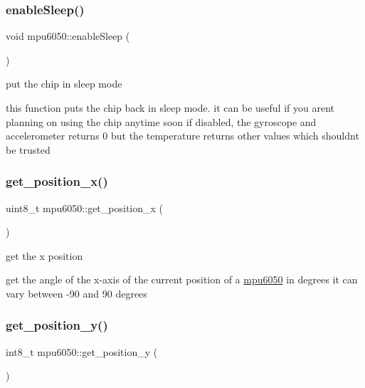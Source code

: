 \subsubsection{\texorpdfstring{enable\+Sleep()}{enableSleep()}}
{\footnotesize\ttfamily void mpu6050\+::enable\+Sleep (\begin{DoxyParamCaption}{ }\end{DoxyParamCaption})\hspace{0.3cm}{\ttfamily [inline]}}



put the chip in sleep mode 

this function puts the chip back in sleep mode. it can be useful if you aren\textquotesingle{}t planning on using the chip anytime soon if disabled, the gyroscope and accelerometer returns 0 but the temperature returns other values which shouldn\textquotesingle{}t be trusted \mbox{\label{classmpu6050_a2de2ed1159eb80c0fc3d0a273b7e058c}} 
\subsubsection{\texorpdfstring{get\+\_\+position\+\_\+x()}{get\_position\_x()}}
{\footnotesize\ttfamily uint8\+\_\+t mpu6050\+::get\+\_\+position\+\_\+x (\begin{DoxyParamCaption}{ }\end{DoxyParamCaption})\hspace{0.3cm}{\ttfamily [inline]}}



get the x position 

get the angle of the x-\/axis of the current position of a \hyperlink{classmpu6050}{mpu6050} in degrees it can vary between -\/90 and 90 degrees \mbox{\label{classmpu6050_ac11bddbc6795e1c36b1f89b743ce63ec}} 
\subsubsection{\texorpdfstring{get\+\_\+position\+\_\+y()}{get\_position\_y()}}
{\footnotesize\ttfamily int8\+\_\+t mpu6050\+::get\+\_\+position\+\_\+y (\begin{DoxyParamCaption}{ }\end{DoxyParamCaption})\hspace{0.3cm}{\ttfamily [inline]}}




